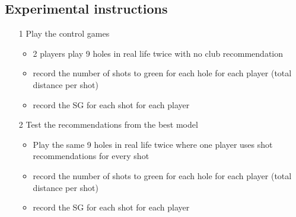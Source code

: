 \documentclass{article}
\begin{document}
\subsection{Experimental instructions}
\begin{itemize}
	\item[1] Play the control games
	\begin{itemize}
		\item 2 players play 9 holes in real life twice with no club recommendation 
		\item record the number of shots to green for each hole for each player (total distance per shot)
		\item record the SG for each shot for each player 
	\end{itemize}
	\item[2] Test the recommendations from the best model
	\begin{itemize}
		\item Play the same 9 holes in real life twice where one player uses shot recommendations for every shot
		\item record the number of shots to green for each hole for each player (total distance per shot)
		\item record the SG for each shot for each player
	\end{itemize}
\end{itemize}
\end{document}
